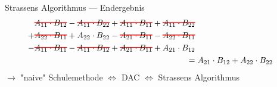 \documentclass{beamer}
\newcommand\hcancel[2][black]{\setbox0=\hbox{$#2$}%
\rlap{\raisebox{.45\ht0}{\textcolor{#1}{\rule{\wd0}{1pt}}}}#2}
\begin{document}
\begin{frame}{Strassens Algorithmus --- Endergebnis}
{{{{{{{{{{{{{{{{{{{                \begin{align*}
                    \hcancel[red]{A_{11} \cdot B_{12}} - \hcancel[red]{A_{11} \cdot B_{22}} + \hcancel[red]{A_{11} \cdot B_{11}} + \hcancel[red]{A_{11} \cdot B_{22}} \\ 
                    + \hcancel[red]{A_{22} \cdot B_{11}} + A_{22} \cdot B_{22} - \hcancel[red]{A_{21} \cdot B_{11}} - \hcancel[red]{A_{22} \cdot B_{11}} \\ 
                    - \hcancel[red]{A_{11} \cdot B_{11}} - \hcancel[red]{A_{11} \cdot B_{12}} + \hcancel[red]{A_{21} \cdot B_{11}} + A_{21} \cdot B_{12} \\
                    \;= &\;A_{21} \cdot B_{12} + A_{22} \cdot B_{22}
                \end{align*}
                $\rightarrow$ "naive" Schulemethode $\Leftrightarrow$ DAC $\Leftrightarrow$ Strassens Algorithmus
}}}}}}}}}}}}}}}}}}}
\pause[19]
\end{frame}
\end{document}
